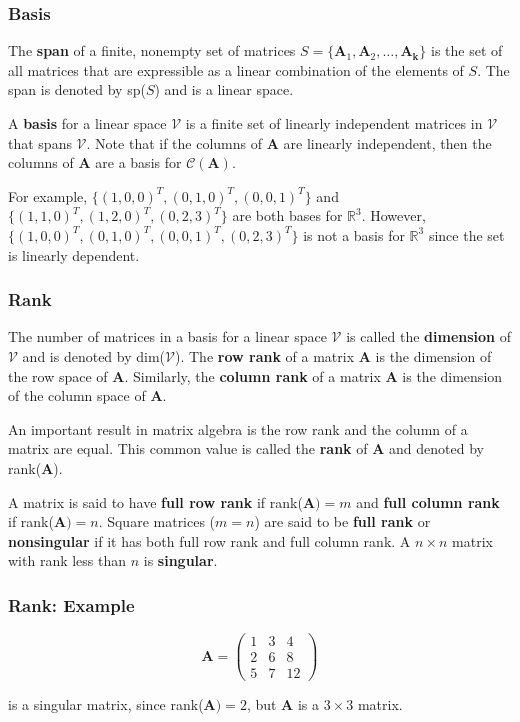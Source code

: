 \documentclass{beamer}
\begin{document}
\begin{frame}
\frametitle{Basis}
The \textbf{span} of a finite, nonempty set of matrices $S = \{\mathbf{A}_1, \mathbf{A}_2, \hdots, \mathbf{A_k}\}$ is the set of all matrices that are expressible as a linear combination of the elements of $S$.  The span is denoted by sp($S$) and is a linear space.
\vspace{5mm}

A \textbf{basis} for a linear space $\mathcal{V}$ is a finite set of linearly independent matrices in $\mathcal{V}$ that spans $\mathcal{V}$.  Note that if the columns of $\mathbf{A}$ are linearly independent, then the columns of $\mathbf{A}$ are a basis for $\mathcal{C}(\mathbf{A})$.
\vspace{5mm}

For example, $\{(1,0,0)^T, (0,1,0)^T, (0,0,1)^T\}$ and $\{(1,1,0)^T, (1,2,0)^T, (0,2,3)^T\}$ are both bases for $\mathbb{R}^3$.  However, $\{(1,0,0)^T, (0,1,0)^T, (0,0,1)^T, (0,2,3)^T\}$ is not a basis for $\mathbb{R}^3$ since the set is linearly dependent.
\end{frame}

\begin{frame}
\frametitle{Rank}
The number of matrices in a basis for a linear space $\mathcal{V}$ is called the \textbf{dimension} of $\mathcal{V}$ and is denoted by dim($\mathcal{V}$).  The \textbf{row rank} of a matrix $\mathbf{A}$ is the dimension of the row space of $\mathbf{A}$.  Similarly, the \textbf{column rank} of a matrix $\mathbf{A}$ is the dimension of the column space of $\mathbf{A}$. 

\vspace{5mm}

An important result in matrix algebra is the row rank and the column of a matrix are equal.  This common value is called the \textbf{rank} of $\mathbf{A}$ and denoted by rank($\mathbf{A}$).

\vspace{5mm}

A matrix is said to have \textbf{full row rank} if rank($\mathbf{A}) = m$ and \textbf{full column rank} if rank($\mathbf{A}) = n$.  Square matrices ($m = n$) are said to be \textbf{full rank} or \textbf{nonsingular} if it has both full row rank and full column rank.  A $n \times n$ matrix with rank less than $n$ is \textbf{singular}.  
\end{frame}

\begin{frame}
\frametitle{Rank: Example}
\[\mathbf{A} = \begin{pmatrix}
    1 & 3 & 4\\
    2 & 6 & 8 \\
    5 & 7 & 12   
\end{pmatrix}
\]

\vspace{5mm}

is a singular matrix, since rank($\mathbf{A}) = 2$, but $\mathbf{A}$ is a $ 3 \times 3$ matrix.
\end{frame}
\end{document}
